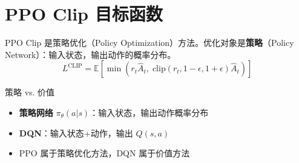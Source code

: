 \section{PPO Clip 目标函数}
PPO Clip 是策略优化（Policy Optimization）方法。优化对象是\textbf{策略}（Policy Network）：输入状态，输出动作的概率分布。
$$L^{\text{CLIP}} = \mathbb{E}\left[\min\left(r_t \hat{A}_t,\; \text{clip}(r_t, 1{-}\epsilon, 1{+}\epsilon)\hat{A}_t\right)\right]$$

\begin{knowledgebox}{策略 vs. 价值}
\begin{itemize}
  \item \textbf{策略网络} $\pi_\theta(a|s)$：输入状态，输出动作概率分布
  \item \textbf{DQN}：输入状态+动作，输出 $Q(s,a)$
  \item PPO 属于策略优化方法，DQN 属于价值方法
\end{itemize}
\end{knowledgebox}


